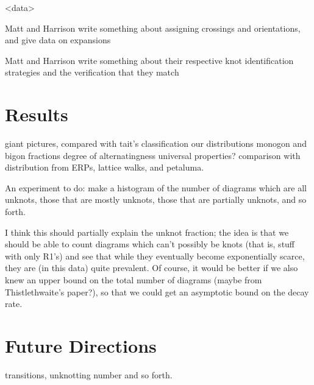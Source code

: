 \documentclass[amsmath,secnumarabic,floatfix,amssymb,nofootinbib,nobibnotes,letterpaper,11pt,tightenlines,showkeys]{revtex4}
\theoremstyle{definition}
\begin{document}
<data>

\begin{center}
Matt and Harrison write something about assigning crossings and orientations, and give data on expansions
\end{center}

\begin{center}
Matt and Harrison write something about their respective knot identification strategies and the verification that they match
\end{center}

\section{Results}

giant pictures, compared with tait's classification
our distributions
monogon and bigon fractions
degree of alternatingness
universal properties? comparison with distribution from ERPs, lattice walks, and petaluma.

An experiment to do: make a histogram of the number of diagrams which are all unknots, those that are mostly unknots, those that are partially unknots, and so forth.

I think this should partially explain the unknot fraction; the idea is that we should be able to count diagrams which can't possibly be knots (that is, stuff with only R1's) and see that while they eventually become exponentially scarce, they are (in this data) quite prevalent. Of course, it would be better if we also knew an upper bound on the total number of diagrams (maybe from Thistlethwaite's paper?), so that we could get an asymptotic bound on the decay rate.


\section{Future Directions}

transitions, unknotting number and so forth.


\end{document}
